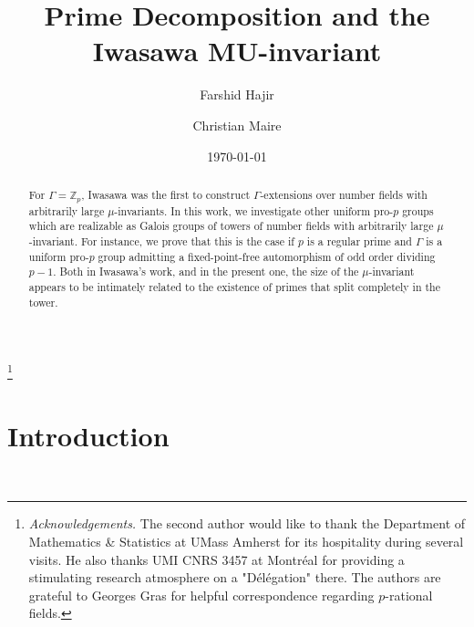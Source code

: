 \documentclass[12pt,a4paper,twoside,english]{smfart}
\def\Z{{\mathbb Z}}
\begin{document}
\date{\today}


\author{Farshid Hajir}
\address{Department of Mathematics \& Statistics, University of Massachusetts, Amherst MA 01003, USA.}

\author{Christian Maire}
\address{Laboratoire de Math\'ematiques, UMR 6623 Universit\'e de Franche-Comté et CNRS, 16 route de Gray, 25030 Besan\c con, France}


\thanks{\emph{Acknowledgements.} The second author would like to thank the Department of Mathematics \& Statistics at UMass Amherst for its hospitality during several visits.  He also thanks UMI CNRS  3457  at Montréal for providing a stimulating research atmosphere on a "Délégation" there.
The authors are grateful to Georges Gras for helpful correspondence regarding $p$-rational fields.
}

\title{Prime Decomposition and the Iwasawa MU-invariant}

\begin{abstract}
For $\Gamma=\Z_p$, Iwasawa was the first to construct $\Gamma$-extensions over number fields with arbitrarily large $\mu$-invariants.  
In this work, we investigate other uniform pro-$p$ groups which are realizable
 as Galois groups of towers of number fields with arbitrarily large $\mu$-invariant. For instance, we prove that this is the case if $p$ is a regular prime and $\Gamma$ is a uniform pro-$p$ group   admitting a fixed-point-free automorphism of odd order dividing $p-1$.  Both in Iwasawa's work, and in the present one, the size of the $\mu$-invariant appears to be intimately related to the existence of primes that split completely in the tower.
\end{abstract}

\maketitle


\tableofcontents

\section*{Introduction}




\
\end{document}
